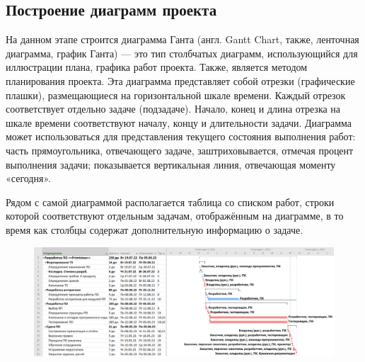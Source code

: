 \subsection{Построение диаграмм проекта}

На данном этапе строится диаграмма Ганта (англ. Gantt Chart, также, ленточная диаграмма, график Ганта) --- это тип столбчатых диаграмм, использующийся для иллюстрации плана, графика работ проекта. Также, является методом планирования проекта. Эта диаграмма представляет собой отрезки (графические плашки), размещающиеся на горизонтальной шкале времени. Каждый отрезок соответствует отдельно задаче (подзадаче). Начало, конец и длина отрезка на шкале времени соответствуют началу, концу и длительности задачи. Диаграмма может использоваться для представления текущего состояния выполнения работ: часть прямоугольника, отвечающего задаче, заштриховывается, отмечая процент выполнения задачи; показывается вертикальная линия, отвечающая моменту «сегодня».

Рядом с самой диаграммой располагается таблица со списком работ, строки которой соответствуют отдельным задачам, отображённым на диаграмме, в то время как столбцы содержат дополнительную информацию о задаче.




\begin{figure}[H]
	\centering
	\includegraphics[width=1.4\textwidth, angle=90]{figures/gantt.png}
	\label{fig:gantt}
\end{figure}


















